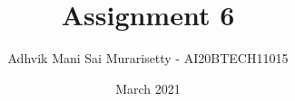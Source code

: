 \documentclass[journal,12pt,twocolumn]{IEEEtran}
\date{March 2021}
\DeclareMathOperator*{\Res}{Res}
\begin{document}
\newcommand{\BEQA}{\begin{eqnarray}}
\newcommand{\EEQA}{\end{eqnarray}}
\newcommand{\define}{\stackrel{\triangle}{=}}

\raggedbottom
\setlength{\parindent}{0pt}
\providecommand{\mbf}{\mathbf}
\providecommand{\pr}[1]{\ensuremath{\Pr\left(#1\right)}}
\providecommand{\qfunc}[1]{\ensuremath{Q\left(#1\right)}}
\providecommand{\fn}[1]{\ensuremath{f\left({#1}\right)}}
\providecommand{\e}[1]{\ensuremath{E\left(#1\right)}}
\providecommand{\sbrak}[1]{\ensuremath{{}\left[#1\right]}}
\providecommand{\lsbrak}[1]{\ensuremath{{}\left[#1\right.}}
\providecommand{\rsbrak}[1]{\ensuremath{{}\left.#1\right]}}
\providecommand{\brak}[1]{\ensuremath{\left(#1\right)}}
\providecommand{\lbrak}[1]{\ensuremath{\left(#1\right.}}
\providecommand{\rbrak}[1]{\ensuremath{\left.#1\right)}}
\providecommand{\cbrak}[1]{\ensuremath{\left\{#1\right\}}}
\providecommand{\lcbrak}[1]{\ensuremath{\left\{#1\right.}}
\providecommand{\rcbrak}[1]{\ensuremath{\left.#1\right\}}}
\theoremstyle{remark}
\newtheorem{rem}{Remark}
\newcommand{\sgn}{\mathop{\mathrm{sgn}}}
\newcommand{\comb}[2]{{}^{#1}\mathrm{C}_{#2}}
\providecommand{\abs}[1]{\vert#1\vert}
\providecommand{\res}[1]{\Res\displaylimits_{#1}} 
\providecommand{\norm}[1]{\lVert#1\rVert}
\providecommand{\mtx}[1]{\mathbf{#1}}
\providecommand{\mean}[1]{E\sbrak{ #1 }}
\providecommand{\fourier}{\overset{\mathcal{F}}{ \rightleftharpoons}}
\providecommand{\system}{\overset{\mathcal{H}}{ \longleftrightarrow}}
\newcommand{\solution}{\noindent \textbf{Solution: }}
\newcommand{\cosec}{\,\text{cosec}\,}
\providecommand{\dec}[2]{\ensuremath{\overset{#1}{\underset{#2}{\gtrless}}}}
\newcommand{\myvec}[1]{\ensuremath{\begin{pmatrix}#1\end{pmatrix}}}
\newcommand{\mydet}[1]{\ensuremath{\begin{vmatrix}#1\end{vmatrix}}}
\makeatletter
\vspace{3cm}
\title{Assignment 6}
\author{Adhvik Mani Sai Murarisetty - AI20BTECH11015}
\maketitle
\newpage
\bigskip
\renewcommand{\thetable}{\theenumi}
\end{document}
